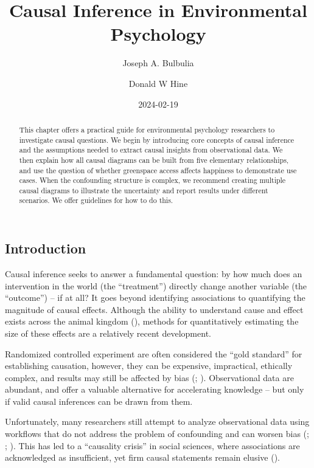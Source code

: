 \documentclass[
  singlecolumn]{article}
\title{Causal Inference in Environmental Psychology}
\author{Joseph A. Bulbulia \and Donald W Hine}
\date{2024-02-19}
\begin{document}
\maketitle
\begin{abstract}
This chapter offers a practical guide for environmental psychology
researchers to investigate causal questions. We begin by introducing
core concepts of causal inference and the assumptions needed to extract
causal insights from observational data. We then explain how all causal
diagrams can be built from five elementary relationships, and use the
question of whether greenspace access affects happiness to demonstrate
use cases. When the confounding structure is complex, we recommend
creating multiple causal diagrams to illustrate the uncertainty and
report results under different scenarios. We offer guidelines for how to
do this.
\end{abstract}

\subsection{Introduction}\label{introduction}

Causal inference seeks to answer a fundamental question: by how much
does an intervention in the world (the ``treatment'') directly change
another variable (the ``outcome'') -- if at all? It goes beyond
identifying associations to quantifying the magnitude of causal effects.
Although the ability to understand cause and effect exists across the
animal kingdom (),
methods for quantitatively estimating the size of these effects are a
relatively recent development.

Randomized controlled experiment are often considered the ``gold
standard'' for establishing causation, however, they can be expensive,
impractical, ethically complex, and results may still be affected by
bias (;
).
Observational data are abundant, and offer a valuable alternative for
accelerating knowledge -- but only if valid causal inferences can be
drawn from them.

Unfortunately, many researchers still attempt to analyze observational
data using workflows that do not address the problem of confounding and
can worsen bias (;
;
). This has
led to a ``causality crisis'' in social sciences, where associations are
acknowledged as insufficient, yet firm causal statements remain elusive
().
\end{document}
